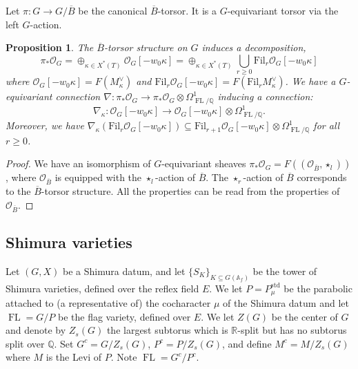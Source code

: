 \documentclass[10pt, oneside]{amsart}
\numberwithin{equation}{subsection}
\newtheorem{proposition}[equation]{Proposition}
\theoremstyle{definition}
\theoremstyle{remark}
\newcommand{\opn}[1]{\operatorname{#1}}
\def\Q{\mathbb{Q}}
\def\oscr{\mathscr{O}}
\begin{document}
Let $\pi : G \rightarrow G/\overline{B}$ be the canonical $\overline{B}$-torsor. It is a $G$-equivariant torsor via the left $G$-action. 

\begin{proposition} 
 The $\overline{B}$-torsor structure on $G$ induces a decomposition, 
$$\pi_* \mathcal{O}_G = \oplus_{\kappa \in X^*(T)} \mathcal{O}_G[-w_0\kappa] =  \oplus_{\kappa \in X^*(T)}  \bigcup_{r \geq 0} \mathrm{Fil}_r \mathcal{O}_G [-w_0\kappa]$$
where $\mathcal{O}_G[-w_0\kappa] = F(M_{\kappa}^\vee)$ and $\mathrm{Fil}_r \mathcal{O}_G [-w_0\kappa] = F(\mathrm{Fil}_{r} M_{\kappa}^\vee)$. We have a $G$-equivariant connection  $\nabla : \pi_*\mathcal{O}_G \rightarrow \pi_*\mathcal{O}_G \otimes \Omega^1_{\opn{FL}/\Q}$ inducing a connection:
$$\nabla_\kappa : \mathcal{O}_G[-w_0\kappa] \rightarrow \mathcal{O}_G[-w_0\kappa] \otimes \Omega^1_{\opn{FL}/\Q}.$$
Moreover, we have $\nabla_{\kappa} (  \mathrm{Fil}_r \mathcal{O}_G [-w_0\kappa]) \subseteq \mathrm{Fil}_{r+1} \mathcal{O}_G [-w_0\kappa] \otimes  \Omega^1_{\opn{FL}/\Q}$ for all $r \geq 0$.
\end{proposition}
\begin{proof}  We have  an isomorphism of $G$-equivariant sheaves $\pi_* \mathcal{O}_G = F((\oscr_{\overline{B}}, \star_l))$, where $\oscr_{\overline{B}}$ is equipped with the $\star_l$-action of $\overline{B}$. The $\star_r$-action of $\overline{B}$ corresponds to  the $\overline{B}$-torsor structure. All the properties can be read from the properties of $\oscr_{\overline{B}}$. 
\end{proof}


\subsection{Shimura varieties} 

Let $(G,X)$ be a Shimura datum, and let $\{S_K\}_{K \subseteq G(\mathbb{A}_f)}$ be the tower of Shimura varieties, defined over the reflex field $E$. We let $P=P_{\mu}^{\opn{std}}$ be the parabolic attached to (a representative of) the  cocharacter $\mu$ of the Shimura datum and let $\opn{FL} = G/P$ be the flag variety, defined over $E$. We let $Z(G)$ be the center of $G$ and denote by $Z_s(G)$ the largest subtorus which is $\mathbb{R}$-split but has no subtorus split over $\mathbb{Q}$. Set $G^c = G/Z_s(G)$, $P^c = P/Z_s(G)$, and define $M^c= M/Z_s(G)$ where $M$ is the Levi of $P$. Note $\opn{FL} = G^c/P^c$.
\end{document}
